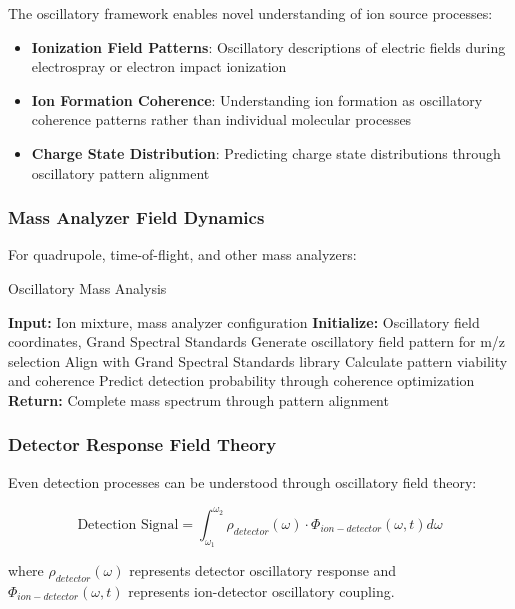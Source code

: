 \documentclass[11pt,a4paper]{article}
\theoremstyle{remark}
\begin{document}
The oscillatory framework enables novel understanding of ion source processes:

\begin{itemize}
\item \textbf{Ionization Field Patterns}: Oscillatory descriptions of electric fields during electrospray or electron impact ionization
\item \textbf{Ion Formation Coherence}: Understanding ion formation as oscillatory coherence patterns rather than individual molecular processes
\item \textbf{Charge State Distribution}: Predicting charge state distributions through oscillatory pattern alignment
\end{itemize}

\subsubsection{Mass Analyzer Field Dynamics}

For quadrupole, time-of-flight, and other mass analyzers:

\begin{algorithm}
\caption{Oscillatory Mass Analysis}
\begin{algorithmic}[1]
\State \textbf{Input:} Ion mixture, mass analyzer configuration
\State \textbf{Initialize:} Oscillatory field coordinates, Grand Spectral Standards
    \State Generate oscillatory field pattern for m/z selection
    \State Align with Grand Spectral Standards library
    \State Calculate pattern viability and coherence
    \State Predict detection probability through coherence optimization
\EndFor
\State \textbf{Return:} Complete mass spectrum through pattern alignment
\end{algorithmic}
\end{algorithm}

\subsubsection{Detector Response Field Theory}

Even detection processes can be understood through oscillatory field theory:

\begin{equation}
\text{Detection Signal} = \int_{\omega_1}^{\omega_2} \rho_{detector}(\omega) \cdot \Phi_{ion-detector}(\omega, t) d\omega
\end{equation}

where $\rho_{detector}(\omega)$ represents detector oscillatory response and $\Phi_{ion-detector}(\omega, t)$ represents ion-detector oscillatory coupling.
\end{document}
